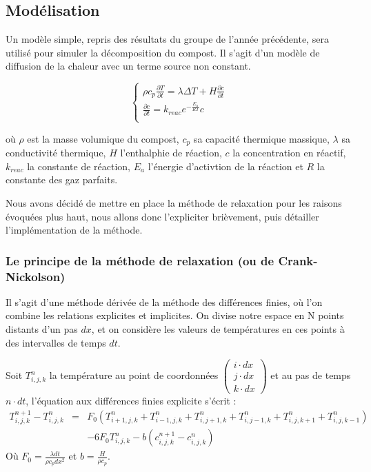 \documentclass[../PS6_RapportFinal.tex]{subfiles}
\begin{document}
\graphicspath{{img/}{tex/img/}}
\subsection{Modélisation}
\label{modelisation}

Un modèle simple, repris des résultats du groupe de l'année précédente, sera utilisé pour simuler la décomposition du compost. Il s'agit d'un modèle de diffusion de la chaleur avec un terme source non constant.

\[
\left\{
\begin{array}{ll}
\displaystyle \rho c_{p} \frac{\partial T}{\partial t} = \displaystyle \lambda \Delta T + H\frac{\partial c}{\partial t} \\
\displaystyle \frac{\partial c}{\partial t} = \displaystyle k_{reac}e^{-\frac{E_{a}}{RT}}c\\
\end{array}
\right.
\]

où $\rho$ est la masse volumique du compost, $c_{p}$ sa capacité thermique massique, $\lambda$ sa conductivité thermique, $H$ l'enthalphie de réaction, $c$ la concentration en réactif, $k_{reac}$ la constante de réaction, $E_{a}$ l'énergie d'activtion de la réaction et $R$ la constante des gaz parfaits.

Nous avons décidé de mettre en place la méthode de relaxation pour les raisons évoquées plus haut, nous allons donc l'expliciter brièvement, puis détailler l'implémentation de la méthode.

\subsubsection{Le principe de la méthode de relaxation (ou de Crank-Nickolson)}

Il s'agit d'une méthode dérivée de la méthode des différences finies, où l'on combine les relations explicites et implicites. On divise notre espace en N points distants d'un pas $dx$, et on considère les valeurs de températures en ces points à des intervalles de temps $dt$.

Soit $T^{n}_{i,j,k}$ la température au point de coordonnées 
$
\left( \begin{array}{c}
i \cdot dx \\
j \cdot dx \\
k \cdot dx 
\end{array} \right)$ et au pas de temps $n \cdot dt$,
 l'équation aux différences finies explicite s'écrit :
\begin{eqnarray}
\label{explicite}
T^{n+1}_{i,j,k} - T^{n}_{i,j,k} & = & F_{0} (T^{n}_{i+1,j,k} + T^{n}_{i-1,j,k} + T^{n}_{i,j+1,k} + T^{n}_{i,j-1,k} + T^{n}_{i,j,k+1} + T^{n}_{i,j,k-1})\nonumber \\
& & - 6F_{0} T^{n}_{i,j,k} - b (c^{n+1}_{i,j,k} - c^{n}_{i,j,k})
\end{eqnarray}
Où $ F_{0} = \frac {\lambda dt} {\rho c_{p} dx^{2}}$ et $ b = \frac{H}{\rho c_{p}}$.
\end{document}
